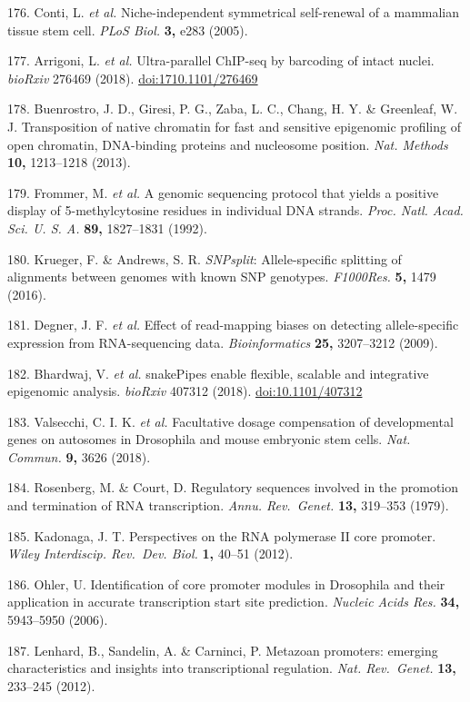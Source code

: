 \documentclass[11pt,twoside]{MPIthesis}
\theoremstyle{definition}
\theoremstyle{definition}
\theoremstyle{definition}
\theoremstyle{remark}
\begin{document}
176. Conti, L. \emph{et al.} Niche-independent symmetrical self-renewal
of a mammalian tissue stem cell. \emph{PLoS Biol.} \textbf{3,} e283
(2005).

177. Arrigoni, L. \emph{et al.} Ultra-parallel ChIP-seq by barcoding of
intact nuclei. \emph{bioRxiv} 276469 (2018). \url{doi:1710.1101/276469}

178. Buenrostro, J. D., Giresi, P. G., Zaba, L. C., Chang, H. Y. \&
Greenleaf, W. J. Transposition of native chromatin for fast and
sensitive epigenomic profiling of open chromatin, DNA-binding proteins
and nucleosome position. \emph{Nat. Methods} \textbf{10,} 1213--1218
(2013).

179. Frommer, M. \emph{et al.} A genomic sequencing protocol that yields
a positive display of 5-methylcytosine residues in individual DNA
strands. \emph{Proc. Natl. Acad. Sci. U. S. A.} \textbf{89,} 1827--1831
(1992).

180. Krueger, F. \& Andrews, S. R. \emph{SNPsplit}: Allele-specific
splitting of alignments between genomes with known SNP genotypes.
\emph{F1000Res.} \textbf{5,} 1479 (2016).

181. Degner, J. F. \emph{et al.} Effect of read-mapping biases on
detecting allele-specific expression from RNA-sequencing data.
\emph{Bioinformatics} \textbf{25,} 3207--3212 (2009).

182. Bhardwaj, V. \emph{et al.} snakePipes enable flexible, scalable and
integrative epigenomic analysis. \emph{bioRxiv} 407312 (2018).
\url{doi:10.1101/407312}

183. Valsecchi, C. I. K. \emph{et al.} Facultative dosage compensation
of developmental genes on autosomes in Drosophila and mouse embryonic
stem cells. \emph{Nat. Commun.} \textbf{9,} 3626 (2018).

184. Rosenberg, M. \& Court, D. Regulatory sequences involved in the
promotion and termination of RNA transcription. \emph{Annu. Rev.~Genet.}
\textbf{13,} 319--353 (1979).

185. Kadonaga, J. T. Perspectives on the RNA polymerase II core
promoter. \emph{Wiley Interdiscip. Rev.~Dev. Biol.} \textbf{1,} 40--51
(2012).

186. Ohler, U. Identification of core promoter modules in Drosophila and
their application in accurate transcription start site prediction.
\emph{Nucleic Acids Res.} \textbf{34,} 5943--5950 (2006).

187. Lenhard, B., Sandelin, A. \& Carninci, P. Metazoan promoters:
emerging characteristics and insights into transcriptional regulation.
\emph{Nat. Rev.~Genet.} \textbf{13,} 233--245 (2012).
\end{document}
